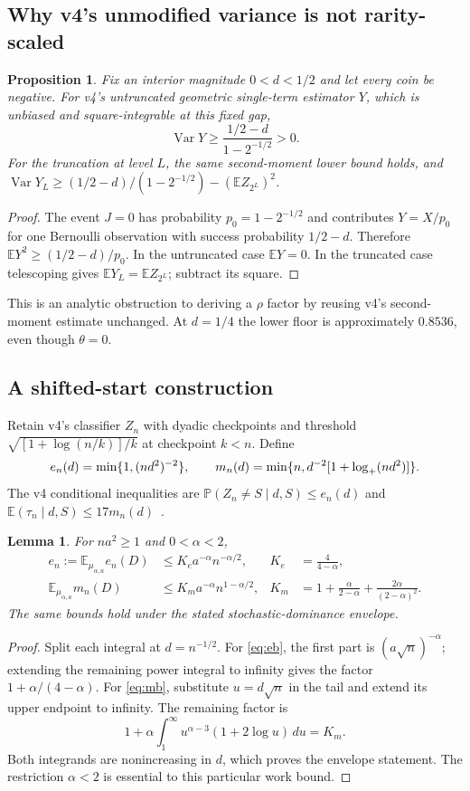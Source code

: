 \documentclass[11pt]{article}
\newtheorem{proposition}[theorem]{Proposition}
\newtheorem{lemma}[theorem]{Lemma}
\theoremstyle{definition}\newtheorem{conjecture}[theorem]{Conjecture}
\theoremstyle{remark}\newtheorem{remark}[theorem]{Remark}
\newcommand{\E}{\mathbb E}\newcommand{\PP}{\mathbb P}\newcommand{\R}{\mathbb R}
\newcommand{\Var}{\operatorname{Var}}\newcommand{\TV}{\operatorname{TV}}
\begin{document}
\subsection{Why v4's unmodified variance is not rarity-scaled}
\begin{proposition}\label{prop:noise}
Fix an interior magnitude $0<d<1/2$ and let every coin be negative. For v4's untruncated geometric single-term estimator $Y$, which is unbiased and square-integrable at this fixed gap,
\[
 \Var Y\ge\frac{1/2-d}{1-2^{-1/2}}>0.
\]
For the truncation at level $L$, the same second-moment lower bound holds, and
$\Var Y_L\ge(1/2-d)/(1-2^{-1/2})-(\E Z_{2^L})^2$.
\end{proposition}
\begin{proof}
The event $J=0$ has probability $p_0=1-2^{-1/2}$ and contributes $Y=X/p_0$ for one Bernoulli observation with success probability $1/2-d$. Therefore $\E Y^2\ge(1/2-d)/p_0$. In the untruncated case $\E Y=0$. In the truncated case telescoping gives $\E Y_L=\E Z_{2^L}$; subtract its square.
\end{proof}
This is an analytic obstruction to deriving a $\rho$ factor by reusing v4's second-moment estimate unchanged. At $d=1/4$ the lower floor is approximately $0.8536$, even though $\theta=0$.

\subsection{A shifted-start construction}
Retain v4's classifier $Z_n$ with dyadic checkpoints and threshold
$\sqrt{[1+\log(n/k)]/k}$ at checkpoint $k<n$. Define
\[
 e_n(d)=\min\{1,(nd^2)^{-2}\},\qquad
 m_n(d)=\min\{n,d^{-2}[1+\log_+(nd^2)]\}.
\]
The v4 conditional inequalities are
$\PP(Z_n\ne S\mid d,S)\le e_n(d)$ and
$\E(\tau_n\mid d,S)\le17m_n(d)$~\cite{baseline}.

\begin{lemma}\label{lem:integrals}
For $na^2\ge1$ and $0<\alpha<2$,
\begin{align}
 e_n:=\E_{\mu_{\alpha,a}}e_n(D)&\le K_e a^{-\alpha}n^{-\alpha/2},&K_e&=\frac4{4-\alpha},\label{eq:eb}\\
 \E_{\mu_{\alpha,a}}m_n(D)&\le K_m a^{-\alpha}n^{1-\alpha/2},&
 K_m&=1+\frac\alpha{2-\alpha}+\frac{2\alpha}{(2-\alpha)^2}.\label{eq:mb}
\end{align}
The same bounds hold under the stated stochastic-dominance envelope.
\end{lemma}
\begin{proof}
Split each integral at $d=n^{-1/2}$. For \eqref{eq:eb}, the first part is $(a\sqrt n)^{-\alpha}$; extending the remaining power integral to infinity gives the factor $1+\alpha/(4-\alpha)$. For \eqref{eq:mb}, substitute $u=d\sqrt n$ in the tail and extend its upper endpoint to infinity. The remaining factor is
\[
 1+\alpha\int_1^\infty u^{\alpha-3}(1+2\log u)\,du
 =K_m.
\]
Both integrands are nonincreasing in $d$, which proves the envelope statement. The restriction $\alpha<2$ is essential to this particular work bound.
\end{proof}
\end{document}
